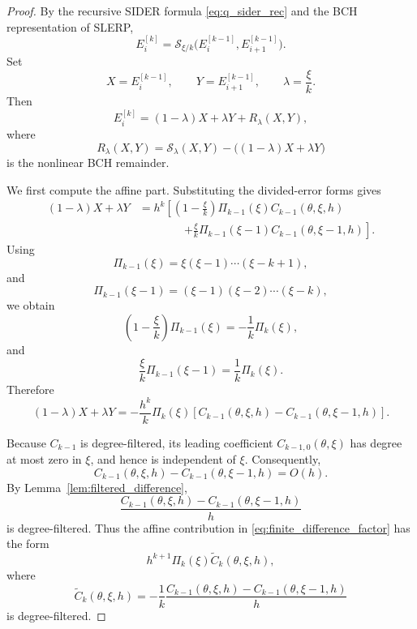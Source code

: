 \documentclass[a4paper,11pt]{article}
\numberwithin{equation}{section}
\theoremstyle{plain}
\theoremstyle{definition}
\theoremstyle{remark}
\begin{document}
\begin{proof}
By the recursive SIDER formula \eqref{eq:q_sider_rec} and the BCH
representation of SLERP,
\[
        E_i^{[k]}
        =
        \mathcal S_{\xi/k}
        \bigl(E_i^{[k-1]},E_{i+1}^{[k-1]}\bigr).
\]
Set
\[
        X=E_i^{[k-1]},
        \qquad
        Y=E_{i+1}^{[k-1]},
        \qquad
        \lambda=\frac{\xi}{k}.
\]
Then
\[
        E_i^{[k]}
        =
        (1-\lambda)X+\lambda Y
        +
        R_\lambda(X,Y),
\]
where
\[
        R_\lambda(X,Y)
        =
        \mathcal S_\lambda(X,Y)
        -
        \bigl((1-\lambda)X+\lambda Y\bigr)
\]
is the nonlinear BCH remainder.

We first compute the affine part.  Substituting the divided-error forms gives
\[
\begin{aligned}
(1-\lambda)X+\lambda Y
&=
h^k
\left[
\left(1-\frac{\xi}{k}\right)
\Pi_{k-1}(\xi)C_{k-1}(\theta,\xi,h)
\right. \\
&\qquad\qquad\left.
+
\frac{\xi}{k}
\Pi_{k-1}(\xi-1)C_{k-1}(\theta,\xi-1,h)
\right].
\end{aligned}
\]
Using
\[
        \Pi_{k-1}(\xi)
        =
        \xi(\xi-1)\cdots(\xi-k+1),
\]
and
\[
        \Pi_{k-1}(\xi-1)
        =
        (\xi-1)(\xi-2)\cdots(\xi-k),
\]
we obtain
\[
        \left(1-\frac{\xi}{k}\right)\Pi_{k-1}(\xi)
        =
        -\frac1k\Pi_k(\xi),
\]
and
\[
        \frac{\xi}{k}\Pi_{k-1}(\xi-1)
        =
        \frac1k\Pi_k(\xi).
\]
Therefore
\begin{equation}
\label{eq:finite_difference_factor}
(1-\lambda)X+\lambda Y
=
-\frac{h^k}{k}\Pi_k(\xi)
\left[
C_{k-1}(\theta,\xi,h)
-
C_{k-1}(\theta,\xi-1,h)
\right].
\end{equation}

Because \(C_{k-1}\) is degree-filtered, its leading coefficient
\(C_{k-1,0}(\theta,\xi)\) has degree at most zero in \(\xi\), and hence is
independent of \(\xi\).  Consequently,
\[
        C_{k-1}(\theta,\xi,h)
        -
        C_{k-1}(\theta,\xi-1,h)
        =
        O(h).
\]
By Lemma~\ref{lem:filtered_difference},
\[
        \frac{
        C_{k-1}(\theta,\xi,h)
        -
        C_{k-1}(\theta,\xi-1,h)}
        {h}
\]
is degree-filtered.  Thus the affine contribution in
\eqref{eq:finite_difference_factor} has the form
\[
        h^{k+1}\Pi_k(\xi)\widetilde C_k(\theta,\xi,h),
\]
where
\[
        \widetilde C_k(\theta,\xi,h)
        =
        -\frac1{k}
        \frac{
        C_{k-1}(\theta,\xi,h)
        -
        C_{k-1}(\theta,\xi-1,h)}
        {h}
\]
is degree-filtered.


\end{proof}
\end{document}
